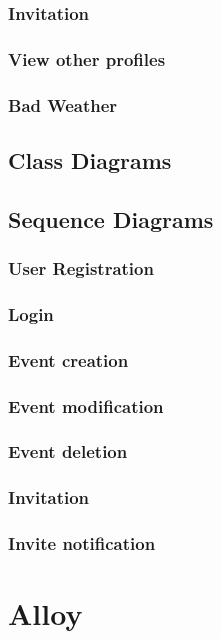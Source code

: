 \subsubsection{Invitation}
\subsubsection{View other profiles}
\subsubsection{Bad Weather}
\subsection{Class Diagrams}
\subsection{Sequence Diagrams}
\subsubsection{User Registration}
\subsubsection{Login}
\subsubsection{Event creation}
\subsubsection{Event modification}
\subsubsection{Event deletion}
\subsubsection{Invitation}
\subsubsection{Invite notification}
\section{Alloy}